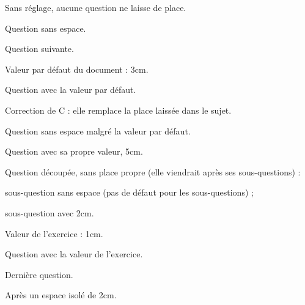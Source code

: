 \begin{exercise}
    Sans réglage, aucune question ne laisse de place.
    \begin{question}
        [A] Question sans espace.
    \end{question}
    \begin{question}
        [B] Question suivante.
    \end{question}
\end{exercise}

\setanswerspace{3cm}
\begin{exercise}
    Valeur par défaut du document : 3cm.
    \begin{question}
        [C] Question avec la valeur par défaut.
    \end{question}
    \begin{correction}
        Correction de C : elle remplace la place laissée dans le sujet.
    \end{correction}
    \begin{question}[space=0pt]
        [D] Question sans espace malgré la valeur par défaut.
    \end{question}
    \begin{question}[space=5cm]
        [E] Question avec sa propre valeur, 5cm.
    \end{question}
    \begin{question}[space=0pt]
        [F] Question découpée, sans place propre (elle viendrait après ses
        sous-questions) :
        \begin{subquestion}
            [G] sous-question sans espace (pas de défaut pour les sous-questions) ;
        \end{subquestion}
        \begin{subquestion}[space=2cm]
            [H] sous-question avec 2cm.
        \end{subquestion}
    \end{question}
\end{exercise}

\begin{exercise}[answerspace=1cm]
    Valeur de l'exercice : 1cm.
    \begin{question}
        [I] Question avec la valeur de l'exercice.
    \end{question}
    \begin{question}
        [J] Dernière question.
    \end{question}
    \answerspace[2cm]
    [K] Après un espace isolé de 2cm.
\end{exercise}


